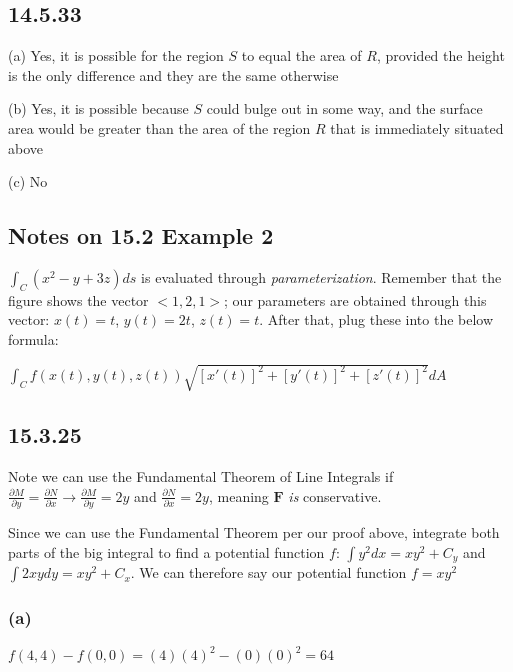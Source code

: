 \documentclass{article}
\begin{document}
\subsection{14.5.33}
\par\noindent\Large (a) Yes, it is possible for the region $S$ to equal the area of $R$, provided the height is the only difference and they are the same otherwise
\par\noindent\Large (b) Yes, it is possible because $S$ could bulge out in some way, and the surface area would be greater than the area of the region $R$ that is immediately situated above
\par\noindent\Large (c) No

\subsection{Notes on 15.2 Example 2}
\par\noindent\Large $\int_{C}(x^{2} - y + 3z)ds$ is evaluated through \textit{parameterization}. Remember that the figure shows the vector $<1, 2, 1>$; our parameters are obtained through this vector: $x(t) = t$, $y(t) = 2t$, $z(t) = t$.  After that, plug these into the below formula:
\par\noindent\Large $\int_{C}f(x(t), y(t), z(t))\sqrt{[x'(t)]^{2} + [y'(t)]^{2} + [z'(t)]^{2}}dA$

\subsection{15.3.25}
\par\noindent\Large Note we can use the Fundamental Theorem of Line Integrals if $\frac{\partial M}{\partial y} = \frac{\partial N}{\partial x} \rightarrow \frac{\partial M}{\partial y} = 2y$ and $\frac{\partial N}{\partial x} = 2y$, meaning $\textbf{F}$ \textit{is} conservative.\vspace{0.25cm}

\par\noindent\Large Since we can use the Fundamental Theorem per our proof above, integrate both parts of the big integral to find a potential function $f$: $\int y^{2}dx = xy^{2} + C_{y}$ and $\int 2xydy = xy^{2} + C_{x}$.  We can therefore say our potential function $f = xy^{2}$

\subsubsection{(a)}
\par\noindent\Large $f(4, 4) - f(0, 0) = (4)(4)^{2} - (0)(0)^{2} = 64$
\end{document}
